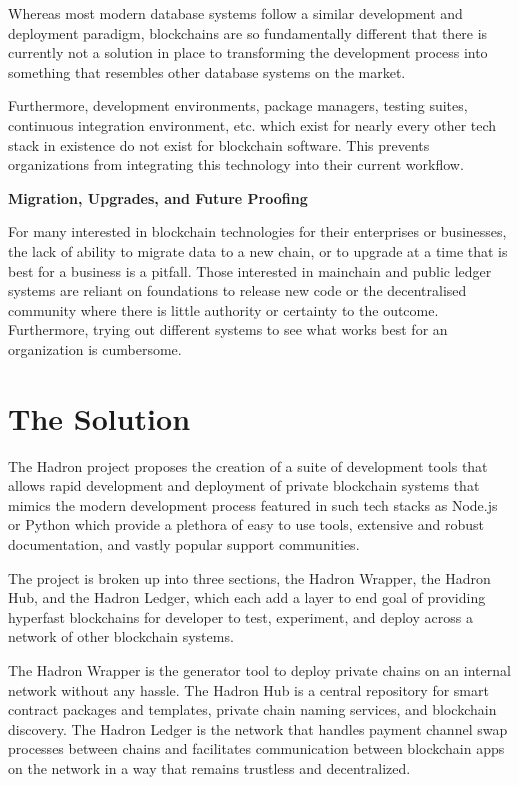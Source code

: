 \documentclass{%
	article}
\begin{document}
Whereas most modern database systems follow a similar development and deployment paradigm, blockchains are so fundamentally different that there is currently not a solution in place to transforming the development process into something that resembles other database systems on the market.

Furthermore, development environments, package managers, testing suites, continuous integration environment, etc. which exist for nearly every other tech stack in existence do not exist for blockchain software. This prevents organizations from integrating this technology into their current workflow.

\begin{center}
\textbf{Migration, Upgrades, and Future Proofing}
\end{center}

For many interested in blockchain technologies for their enterprises or businesses, the lack of ability to migrate data to a new chain, or to upgrade at a time that is best for a business is a pitfall. Those interested in mainchain and public ledger systems are reliant on foundations to release new code or the decentralised community where there is little authority or certainty to the outcome. Furthermore, trying out different systems to see what works best for an organization is cumbersome.

\section{The Solution}

The Hadron project proposes the creation of a suite of development tools that allows rapid development and deployment of private blockchain systems that mimics the modern development process featured in such tech stacks as Node.js or Python which provide a plethora of easy to use tools, extensive and robust documentation, and vastly popular support communities.

The project is broken up into three sections, the Hadron Wrapper, the Hadron Hub, and the Hadron Ledger, which each add a layer to end goal of providing hyperfast blockchains for developer to test, experiment, and deploy across a network of other blockchain systems.

The Hadron Wrapper is the generator tool to deploy private chains on an internal network without any hassle. The Hadron Hub is a central repository for smart contract packages and templates, private chain naming services, and blockchain discovery. The Hadron Ledger is the network that handles payment channel swap processes between chains and facilitates communication between blockchain apps on the network in a way that remains trustless and decentralized.
\end{document}
